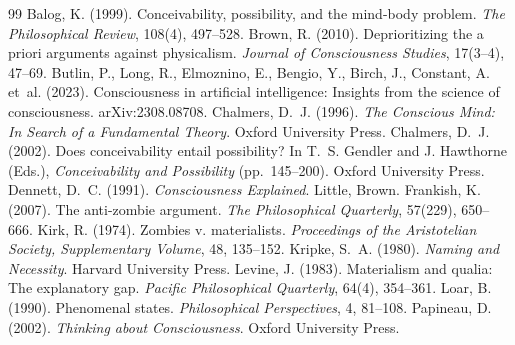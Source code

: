 \documentclass{situationist-preprint}
\begin{document}
\begin{thebibliography}{99}\small
{} Balog, K. (1999). Conceivability, possibility, and the mind-body problem. \emph{The Philosophical Review}, 108(4), 497--528.
 Brown, R. (2010). Deprioritizing the a priori arguments against physicalism. \emph{Journal of Consciousness Studies}, 17(3--4), 47--69.
 Butlin, P., Long, R., Elmoznino, E., Bengio, Y., Birch, J., Constant, A. et~al. (2023). Consciousness in artificial intelligence: Insights from the science of consciousness. arXiv:2308.08708.
 Chalmers, D.~J. (1996). \emph{The Conscious Mind: In Search of a Fundamental Theory}. Oxford University Press.
 Chalmers, D.~J. (2002). Does conceivability entail possibility? In T.~S. Gendler and J. Hawthorne (Eds.), \emph{Conceivability and Possibility} (pp.~145--200). Oxford University Press.
 Dennett, D.~C. (1991). \emph{Consciousness Explained}. Little, Brown.
 Frankish, K. (2007). The anti-zombie argument. \emph{The Philosophical Quarterly}, 57(229), 650--666.
 Kirk, R. (1974). Zombies v. materialists. \emph{Proceedings of the Aristotelian Society, Supplementary Volume}, 48, 135--152.
 Kripke, S.~A. (1980). \emph{Naming and Necessity}. Harvard University Press.
 Levine, J. (1983). Materialism and qualia: The explanatory gap. \emph{Pacific Philosophical Quarterly}, 64(4), 354--361.
 Loar, B. (1990). Phenomenal states. \emph{Philosophical Perspectives}, 4, 81--108.
 Papineau, D. (2002). \emph{Thinking about Consciousness}. Oxford University Press.
\end{thebibliography}
\end{document}
